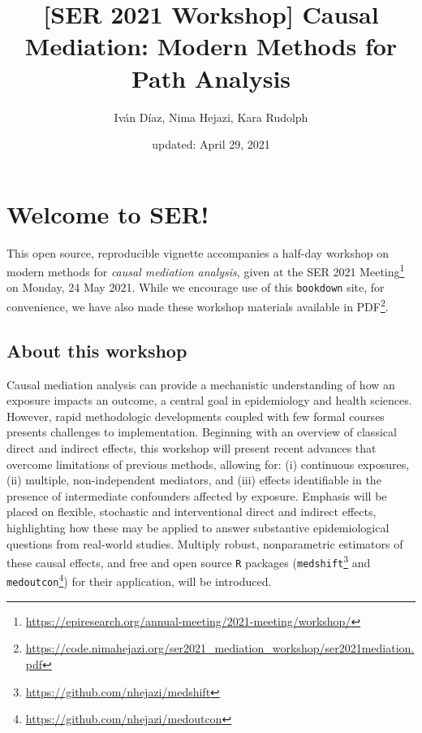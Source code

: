 \documentclass[
  12pt,
]{book}
\title{{[}SER 2021 Workshop{]} Causal Mediation: Modern Methods for Path Analysis}
\author{Iván Díaz, Nima Hejazi, Kara Rudolph}
\date{updated: April 29, 2021}
\newcommand{\passthrough}[1]{#1}
\renewcommand{\href}[2]{#2\footnote{\url{#1}}}
\theoremstyle{definition}
\theoremstyle{definition}
\theoremstyle{definition}
\newcommand{\1}{\mathbbm{1}}
\begin{document}
\maketitle


\thispagestyle{empty}

\begin{center}
\end{center}

\setlength{\abovedisplayskip}{-5pt}
\setlength{\abovedisplayshortskip}{-5pt}

\mainmatter

{
\hypersetup{linkcolor=}
\setcounter{tocdepth}{2}
\tableofcontents
}
\hypertarget{welcome-to-ser}{%
\chapter*{Welcome to SER!}\label{welcome-to-ser}}


This open source, reproducible vignette accompanies a half-day workshop on
modern methods for \emph{causal mediation analysis}, given at the \href{https://epiresearch.org/annual-meeting/2021-meeting/workshop/}{SER 2021
Meeting} on
Monday, 24 May 2021. While we encourage use of this \passthrough{\lstinline!bookdown!} site, for
convenience, we have also made these workshop materials \href{https://code.nimahejazi.org/ser2021_mediation_workshop/ser2021mediation.pdf}{available in
PDF}.

\hypertarget{about}{%
\section{About this workshop}\label{about}}

Causal mediation analysis can provide a mechanistic understanding of how an
exposure impacts an outcome, a central goal in epidemiology and health sciences.
However, rapid methodologic developments coupled with few formal courses
presents challenges to implementation. Beginning with an overview of classical
direct and indirect effects, this workshop will present recent advances that
overcome limitations of previous methods, allowing for: (i) continuous
exposures, (ii) multiple, non-independent mediators, and (iii) effects
identifiable in the presence of intermediate confounders affected by exposure.
Emphasis will be placed on flexible, stochastic and interventional direct and
indirect effects, highlighting how these may be applied to answer substantive
epidemiological questions from real-world studies. Multiply robust,
nonparametric estimators of these causal effects, and free and open source \passthrough{\lstinline!R!}
packages (\href{https://github.com/nhejazi/medshift}{\passthrough{\lstinline!medshift!}} and
\href{https://github.com/nhejazi/medoutcon}{\passthrough{\lstinline!medoutcon!}}) for their application, will
be introduced.
\end{document}
